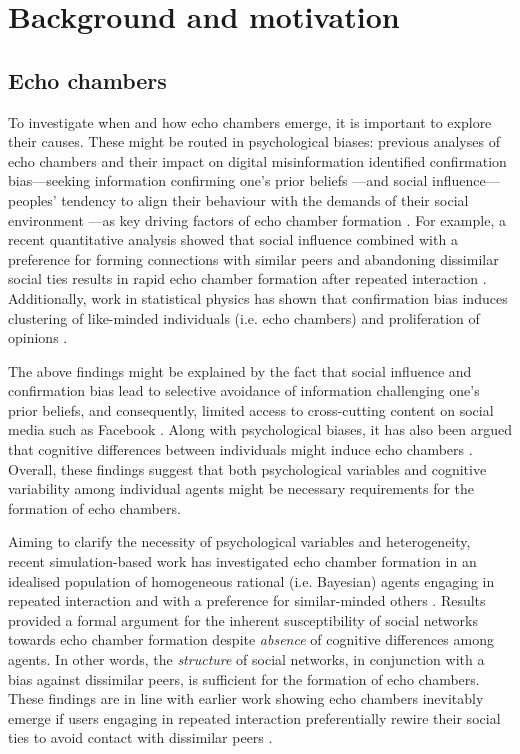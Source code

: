 \documentclass[fleqn,10pt]{wlscirep}
\begin{document}
\section*{Background and motivation}
\subsection*{Echo chambers}
To investigate when and how echo chambers emerge, it is important to explore their causes. These might be routed in psychological biases: previous analyses of echo chambers and their impact on digital misinformation identified confirmation bias---seeking information confirming one's prior beliefs \cite{nickerson1998confirmation}---and social influence---peoples' tendency to align their behaviour with the demands of their social environment \cite{kelman1958compliance}---as key driving factors of echo chamber formation
\cite{del2016spreading, starnini2016emergence, sikder2020minimalistic}. For example, a recent quantitative analysis showed that social influence combined with a preference for forming connections with similar peers and abandoning dissimilar social ties results in rapid echo chamber formation after repeated interaction \cite{sasahara2019inevitability}. Additionally, work in statistical physics has shown that confirmation bias induces clustering of like-minded individuals (i.e. echo chambers) and proliferation of opinions \cite{ngampruetikorn2016bias}. 

The above findings might be explained by the fact that social influence and confirmation bias lead to selective avoidance of information challenging one's prior beliefs, and consequently, limited access to cross-cutting content on social media such as Facebook \cite{henry2011emergence, bakshy2015exposure, ngampruetikorn2016bias}. Along with psychological biases, it has also been argued that cognitive differences between individuals might induce echo chambers \cite{barkun2013culture}. Overall, these findings suggest that both psychological variables and cognitive variability among individual agents might be necessary requirements for the formation of echo chambers.

Aiming to clarify the necessity of psychological variables and heterogeneity, recent simulation-based work has investigated echo chamber formation in an idealised population of homogeneous rational (i.e. Bayesian) agents engaging in repeated interaction and with a preference for similar-minded others \cite{madsen2018large, madsen2017growing}. Results provided a formal argument for the inherent susceptibility of social networks towards echo chamber formation despite \emph{absence} of cognitive differences among agents. In other words, the \textit{structure} of social networks, in conjunction with a bias against dissimilar peers, is sufficient for the formation of echo chambers. These findings are in line with earlier work showing echo chambers inevitably emerge if users engaging in repeated interaction preferentially rewire their social ties to avoid contact with dissimilar peers \cite{henry2011emergence}. 
\end{document}
